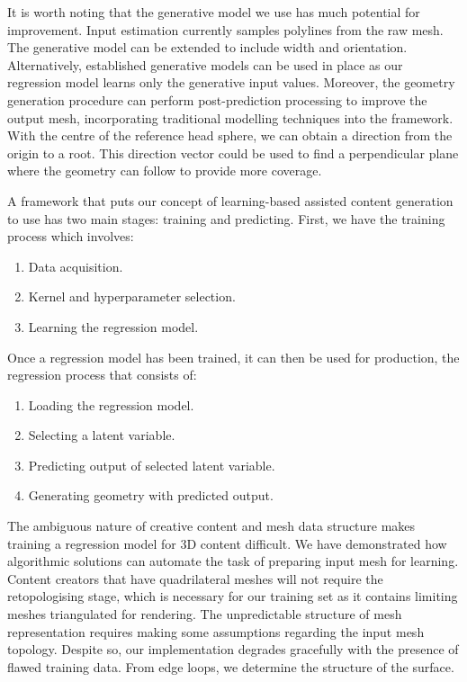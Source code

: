 \documentclass[ %
author={Dillon Keith Diep},
supervisor={Dr. Carl Henrik Ek},
degree={MEng},
title={ART-CG Hair:},
subtitle={Assisted Real-time Content Generation of Stylised Virtual Hair},
type={Research},
year={2017} ]{dissertation}
\begin{document}
It is worth noting that the generative model we use has much potential for improvement. Input estimation currently samples polylines from the raw mesh. The generative model can be extended to include width and orientation. Alternatively, established generative models can be used in place as our regression model learns only the generative input values. Moreover, the geometry generation procedure can perform post-prediction processing to improve the output mesh, incorporating traditional modelling techniques into the framework. With the centre of the reference head sphere, we can obtain a direction from the origin to a root. This direction vector could be used to find a perpendicular plane where the geometry can follow to provide more coverage.

A framework that puts our concept of learning-based assisted content generation to use has two main stages: training and predicting. First, we have the training process which involves:
\begin{enumerate}
	\item Data acquisition.
	\item Kernel and hyperparameter selection.
	\item Learning the regression model.
\end{enumerate}
Once a regression model has been trained, it can then be used for production, the regression process that consists of:
\begin{enumerate}
	\item Loading the regression model.
	\item Selecting a latent variable.
	\item Predicting output of selected latent variable.
	\item Generating geometry with predicted output.
\end{enumerate}

The ambiguous nature of creative content and mesh data structure makes training a regression model for 3D content difficult. We have demonstrated how algorithmic solutions can automate the task of preparing input mesh for learning. Content creators that have quadrilateral meshes will not require the retopologising stage, which is necessary for our training set as it contains limiting meshes triangulated for rendering. The unpredictable structure of mesh representation requires making some assumptions regarding the input mesh topology. Despite so, our implementation degrades gracefully with the presence of flawed training data. From edge loops, we determine the structure of the surface.
\end{document}
